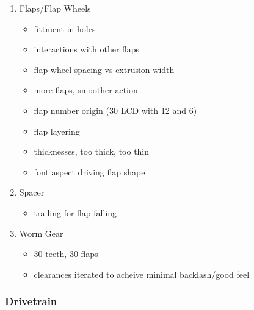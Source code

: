 \documentclass[11pt]{article}
\begin{document}
\begin{enumerate}
\item Flaps/Flap Wheels
\label{sec:org1b9af3e}
\begin{itemize}
\item fittment in holes
\item interactions with other flaps
\item flap wheel spacing vs extrusion width
\item more flaps, smoother action
\item flap number origin (30 LCD with 12 and 6)
\item flap layering
\item thicknesses, too thick, too thin
\item font aspect driving flap shape
\end{itemize}

\item Spacer
\label{sec:orgd5fa406}
\begin{itemize}
\item trailing for flap falling
\end{itemize}

\item Worm Gear
\label{sec:org88e9ace}
\begin{itemize}
\item 30 teeth, 30 flaps
\item clearances iterated to acheive minimal backlash/good feel
\end{itemize}
\end{enumerate}

\subsubsection{Drivetrain}
\label{sec:org1e68af4}
\end{document}
